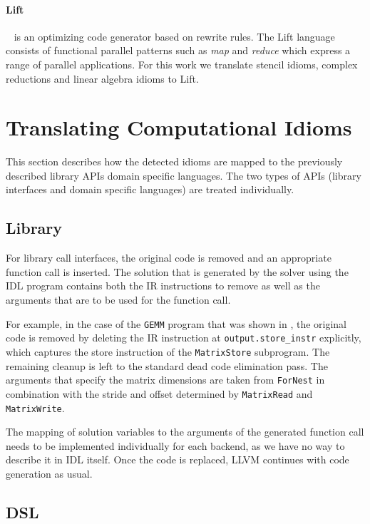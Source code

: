     \paragraph{Lift}~\cite{steuwer15rewrite, SteuwerRD17, HagedornSSGD18} is an
    optimizing code generator based on rewrite rules.
    The Lift language consists of functional parallel patterns such as
    \emph{map} and \emph{reduce} which  express a range of parallel
    applications.
    For this work we translate stencil idioms, complex reductions and linear
    algebra idioms to Lift.

\section{Translating Computational Idioms}

    This section describes how the detected idioms are mapped to the previously
    described library APIs domain specific languages.
    The two types of APIs (library interfaces and domain specific languages) are
    treated individually.

\subsection{Library}

    For library call interfaces, the original code is removed and an appropriate
    function call is inserted.
    The solution that is generated by the solver using the IDL program contains
    both the IR instructions to remove as well as the arguments that are to be
    used for the function call.

    For example, in the case of the {\tt GEMM} program that was shown in
    , the original code is removed by deleting the IR
    instruction at {\tt output.store\_instr} explicitly, which captures the
    store instruction of the {\tt MatrixStore} subprogram.
    The remaining cleanup is left to the standard dead code elimination pass.
    The arguments that specify the matrix dimensions are taken from
    {\tt ForNest} in combination with the stride and offset determined by
    {\tt MatrixRead} and {\tt MatrixWrite}.

    The mapping of solution variables to the arguments of the generated function
    call needs to be implemented individually for each backend, as we have no
    way to describe it in IDL itself.
    Once the code is replaced, LLVM continues with code generation as usual.

\subsection{DSL}

